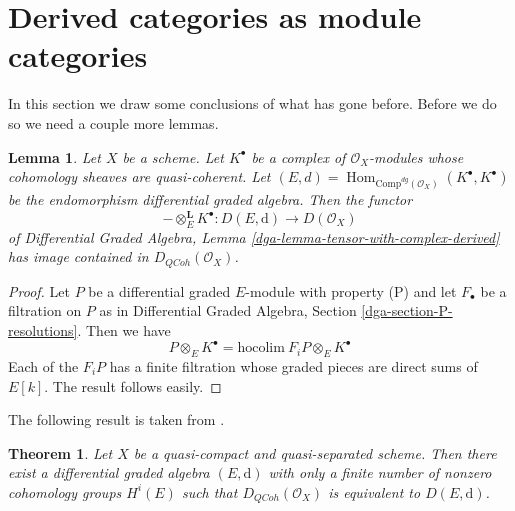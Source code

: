 \documentclass{stacks-project}
\theoremstyle{plain}
\newtheorem{theorem}[subsection]{Theorem}
\newtheorem{lemma}[subsection]{Lemma}
\theoremstyle{definition}
\theoremstyle{remark}
\numberwithin{equation}{subsection}
\def\Hom{\mathop{\mathrm{Hom}}\nolimits}
\def\QCoh{\mathit{QCoh}}
\begin{document}
\section{Derived categories as module categories}
\label{section-derived-is-dga}

\noindent
In this section we draw some conclusions of what has gone before.
Before we do so we need a couple more lemmas.

\begin{lemma}
\label{lemma-tensor-with-QCoh-complex}
Let $X$ be a scheme. Let $K^\bullet$ be a complex of $\mathcal{O}_X$-modules
whose cohomology sheaves are quasi-coherent. Let
$(E, d) = \Hom_{\text{Comp}^{dg}(\mathcal{O}_X)}(K^\bullet, K^\bullet)$
be the endomorphism differential graded algebra. Then the functor
$$
- \otimes_E^\mathbf{L} K^\bullet :
D(E, \text{d}) \longrightarrow D(\mathcal{O}_X)
$$
of
Differential Graded Algebra, Lemma
\ref{dga-lemma-tensor-with-complex-derived}
has image contained in $D_\QCoh(\mathcal{O}_X)$.
\end{lemma}

\begin{proof}
Let $P$ be a differential graded $E$-module with property (P)
and let $F_\bullet$ be a filtration on $P$ as in
Differential Graded Algebra, Section \ref{dga-section-P-resolutions}.
Then we have
$$
P \otimes_E K^\bullet = \text{hocolim}\ F_iP \otimes_E K^\bullet
$$
Each of the $F_iP$ has a finite filtration whose graded pieces
are direct sums of $E[k]$. The result follows easily.
\end{proof}

\noindent
The following result is taken from \cite{BvdB}.

\begin{theorem}
\label{theorem-DQCoh-is-Ddga}
Let $X$ be a quasi-compact and quasi-separated scheme.
Then there exist a differential graded algebra $(E, \text{d})$
with only a finite number of nonzero cohomology groups $H^i(E)$
such that $D_\QCoh(\mathcal{O}_X)$ is equivalent
to $D(E, \text{d})$.
\end{theorem}
\end{document}
